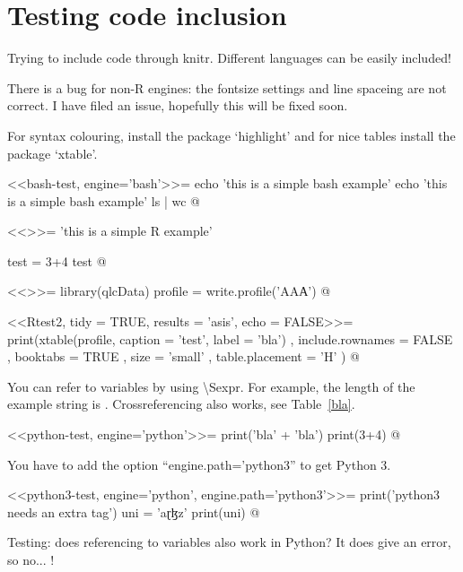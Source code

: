 \chapter{Testing code inclusion}


Trying to include code through knitr. 
Different languages can be easily 
included!

There is a bug for non-R engines: the fontsize settings and line spaceing are not correct. I have 
filed an issue, hopefully this will be fixed soon. 

For syntax colouring, install the package `highlight' and for nice tables 
install the package `xtable'.

<<bash-test, engine='bash'>>=
echo 'this is a simple bash example'
echo 'this is a simple bash example'
ls | wc
@

<<>>=
'this is a simple R example'

test = 3+4
test
@

<<>>=
library(qlcData) 
profile = write.profile('AΑА')
@

<<Rtest2, tidy = TRUE, results = 'asis', echo = FALSE>>=
print(xtable(profile, caption = 'test', label = 'bla')
  , include.rownames = FALSE
  , booktabs = TRUE
  , size = 'small'
  , table.placement = 'H'
  )
@



You can refer to variables by using \textbackslash Sexpr{}. 
For example, the length of the example string is .
Crossreferencing also works, see Table~\ref{bla}.

<<python-test, engine='python'>>=
print('bla' + 'bla')
print(3+4)
@

You have to add the option ``engine.path='python3'' to get Python 3.

<<python3-test, engine='python', engine.path='python3'>>=
print('python3 needs an extra tag')
uni = 'aɽɮz'
print(uni)
@

Testing: does referencing to variables also work in Python? It does give an error, so no... !